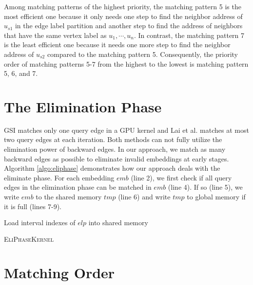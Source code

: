 Among matching patterns of the highest priority, the matching pattern 5 is the most efficient one because it only needs one step to find the neighbor address of $u_{s1}$ in the edge label partition and another step to find the address of neighbors that have the same vertex label as $u_1, \cdots, u_n$. In contrast, the matching pattern 7 is the least efficient one because it needs one more step to find the neighbor address of $u_{s2}$ compared to the matching pattern 5. Consequently, the priority order of matching patterns 5-7 from the highest to the lowest is matching pattern 5, 6, and 7.

\section{The Elimination Phase\label{sec:eliphase}}
GSI \cite{zeng2020gsi} matches only one query edge in a GPU kernel and Lai et al. \cite{lai2015scalable} matches at most two query edges at each iteration. Both methods can not fully utilize the elimination power of backward edges. In our approach, we match as many backward edges as possible to eliminate invalid embeddings at early stages. Algorithm \ref{algo:eliphase} demonstrates how our approach deals with the eliminate phase. For each embedding $emb$ (line 2), we first check if all query edges in the elimination phase can be matched in $emb$ (line 4). If so (line 5), we write $emb$ to the shared memory $tmp$ (line 6) and write $tmp$ to global memory if it is full (lines 7-9).


\begin{algorithm}
Load interval indexes of $elp$ into shared memory\;
\caption{\textsc{EliPhaseKernel}}
\label{algo:eliphase}
\end{algorithm}




\section{Matching Order\label{sec:matchingorder}}

